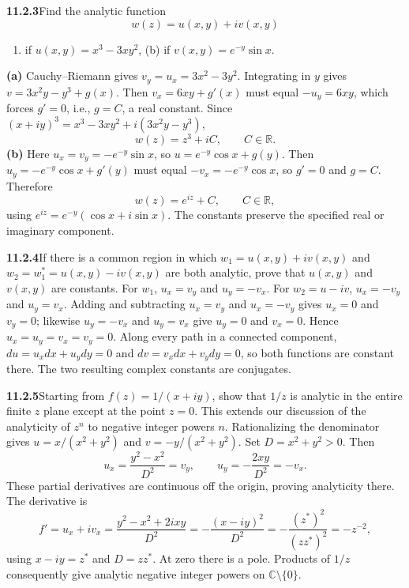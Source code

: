 \par\bigskip
\noindent\textbf{11.2.3}\quad Find the analytic function
\[
w(z)=u(x,y)+iv(x,y)
\]
\begin{enumerate}
\item[(a)] if $u(x,y)=x^{3}-3xy^{2}$,\quad
(b) if $v(x,y)=e^{-y}\sin x$.
\end{enumerate}
\solution
\textbf{(a)} Cauchy--Riemann gives $v_y=u_x=3x^2-3y^2$.
Integrating in $y$ gives $v=3x^2y-y^3+g(x)$.
Then $v_x=6xy+g'(x)$ must equal $-u_y=6xy$, which forces $g'=0$,
i.e., $g=C$, a real constant. Since
$(x+iy)^3=x^3-3xy^2+i(3x^2y-y^3)$,
\[
\boxed{w(z)=z^3+iC,\qquad C\in\mathbb R}.
\]
\textbf{(b)} Here $u_x=v_y=-e^{-y}\sin x$, so
$u=e^{-y}\cos x+g(y)$. Then $u_y=-e^{-y}\cos x+g'(y)$ must equal
$-v_x=-e^{-y}\cos x$, so $g'=0$ and $g=C$. Therefore
\[
\boxed{w(z)=e^{iz}+C,\qquad C\in\mathbb R},
\]
using $e^{iz}=e^{-y}(\cos x+i\sin x)$.
The constants preserve the specified real or imaginary component.

\par\bigskip
\noindent\textbf{11.2.4}\quad If there is a common  region in which
$w_{1}=u(x,y)+iv(x,y)$ and $w_{2}=w_{1}^{*}=u(x,y)-iv(x,y)$ are both analytic,
prove that $u(x,y)$ and $v(x,y)$ are constants.
\solution
For $w_1$, $u_x=v_y$ and $u_y=-v_x$.
For $w_2=u-iv$, $u_x=-v_y$ and $u_y=v_x$.
Adding and subtracting $u_x=v_y$ and $u_x=-v_y$ gives $u_x=0$ and
$v_y=0$; likewise $u_y=-v_x$ and $u_y=v_x$ give $u_y=0$ and $v_x=0$.
Hence $u_x=u_y=v_x=v_y=0$.
Along every path in a connected component, $du=u_xdx+u_ydy=0$
and $dv=v_xdx+v_ydy=0$, so both functions are constant there.
The two resulting complex constants are conjugates.

\par\bigskip
\noindent\textbf{11.2.5}\quad Starting from $f(z)=1/(x+iy)$, show that $1/z$
is analytic in the entire finite $z$ plane except at the point $z=0$. This
extends our discussion of the analyticity of $z^{n}$ to negative integer
powers $n$.
\solution
Rationalizing the denominator gives
$u=x/(x^2+y^2)$ and $v=-y/(x^2+y^2)$. Set $D=x^2+y^2>0$.
Then
\[
u_x=\frac{y^2-x^2}{D^2}=v_y,\qquad
u_y=-\frac{2xy}{D^2}=-v_x.
\]
These partial derivatives are continuous off the origin, proving
analyticity there. The derivative is
\[
f'=u_x+iv_x=\frac{y^2-x^2+2ixy}{D^2}
=-\frac{(x-iy)^2}{D^2}=-\frac{(z^*)^2}{(zz^*)^2}=\boxed{-z^{-2}},
\]
using $x-iy=z^*$ and $D=zz^*$.
At zero there is a pole. Products of $1/z$ consequently give analytic
negative integer powers on $\mathbb C\setminus\{0\}$.

